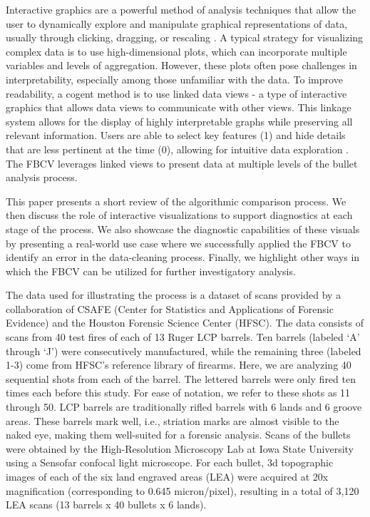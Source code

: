 \documentclass[
  12pt]{article}
\begin{document}
Interactive graphics are a powerful method of analysis techniques that
allow the user to dynamically explore and manipulate graphical
representations of data, usually through clicking, dragging, or
rescaling \citep{eickHighInteractionGraphics1995}. A typical strategy
for visualizing complex data is to use high-dimensional plots, which can
incorporate multiple variables and levels of aggregation. However, these
plots often pose challenges in interpretability, especially among those
unfamiliar with the data. To improve readability, a cogent method is to
use linked data views - a type of interactive graphics that allows data
views to communicate with other views. This linkage system allows for
the display of highly interpretable graphs while preserving all relevant
information. Users are able to select key features (1) and hide details
that are less pertinent at the time (0), allowing for intuitive data
exploration \citep{willsLinkedDataViews2008}. The FBCV leverages linked
views to present data at multiple levels of the bullet analysis process.

This paper presents a short review of the algorithmic comparison
process. We then discuss the role of interactive visualizations to
support diagnostics at each stage of the process. We also showcase the
diagnostic capabilities of these visuals by presenting a real-world use
case where we successfully applied the FBCV to identify an error in the
data-cleaning process. Finally, we highlight other ways in which the
FBCV can be utilized for further investigatory analysis.

The data used for illustrating the process is a dataset of scans
provided by a collaboration of CSAFE (Center for Statistics and
Applications of Forensic Evidence) and the Houston Forensic Science
Center (HFSC). The data consists of scans from 40 test fires of each of
13 Ruger LCP barrels. Ten barrels (labeled `A' through `J') were
consecutively manufactured, while the remaining three (labeled 1-3) come
from HFSC's reference library of firearms. Here, we are analyzing 40
sequential shots from each of the barrel. The lettered barrels were only
fired ten times each before this study. For ease of notation, we refer
to these shots as 11 through 50. LCP barrels are traditionally rifled
barrels with 6 lands and 6 groove areas. These barrels mark well, i.e.,
striation marks are almost visible to the naked eye, making them
well-suited for a forensic analysis. Scans of the bullets were obtained
by the High-Resolution Microscopy Lab at Iowa State University using a
Sensofar confocal light microscope. For each bullet, 3d topographic
images of each of the six land engraved areas (LEA) were acquired at 20x
magnification (corresponding to 0.645 micron/pixel), resulting in a
total of 3,120 LEA scans (13 barrels x 40 bullets x 6 lands).
\end{document}
